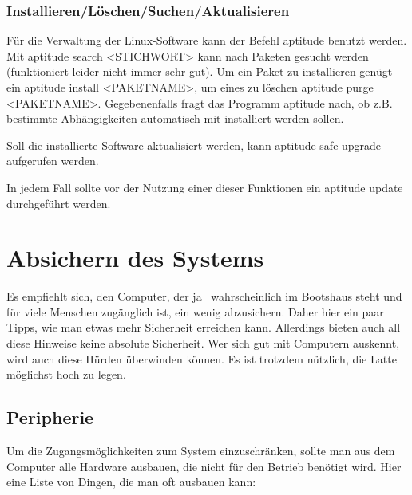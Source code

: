 \documentclass[a4paper,12pt,twoside]{article}
\begin{document}
\bigskip

\subsubsection[Installieren/Löschen/Suchen/Aktualisieren]{Installieren/Löschen/Suchen/Aktualisieren}
\label{bkm:RefHeading11661832955836}Für die Verwaltung der
Linux-Software kann der Befehl {\textquotedbl}aptitude{\textquotedbl}
benutzt werden. Mit {\textquotedbl}aptitude search
{\textless}STICHWORT{\textgreater}{\textquotedbl} kann nach Paketen
gesucht werden (funktioniert leider nicht immer sehr gut). Um ein Paket
zu installieren genügt ein {\textquotedbl}aptitude install
{\textless}PAKETNAME{\textgreater}{\textquotedbl}, um eines zu löschen
{\textquotedbl}aptitude purge
{\textless}PAKETNAME{\textgreater}{\textquotedbl}. Gegebenenfalls fragt
das Programm aptitude nach, ob z.B. bestimmte Abhängigkeiten
automatisch mit installiert werden sollen.

Soll die installierte Software aktualisiert werden, kann
{\textquotedbl}aptitude safe-upgrade{\textquotedbl} aufgerufen werden.

In jedem Fall sollte vor der Nutzung einer dieser Funktionen ein
{\textquotedbl}aptitude update{\textquotedbl} durchgeführt werden.


\bigskip

\section[Absichern des Systems]{Absichern des Systems}
\label{bkm:RefHeading173029115634}Es empfiehlt sich, den Computer, der
ja \ wahrscheinlich im Bootshaus steht und für viele Menschen
zugänglich ist, ein wenig abzusichern. Daher hier ein paar Tipps, wie
man etwas mehr Sicherheit erreichen kann. Allerdings bieten auch all
diese Hinweise keine absolute Sicherheit. Wer sich gut mit Computern
auskennt, wird auch diese Hürden überwinden können. Es ist trotzdem
nützlich, die Latte möglichst hoch zu legen.


\bigskip

\subsection[Peripherie]{Peripherie}
\label{bkm:RefHeading31562628}Um die Zugangsmöglichkeiten zum System
einzuschränken, sollte man aus dem Computer alle Hardware ausbauen, die
nicht für den Betrieb benötigt wird. Hier eine Liste von Dingen, die
man oft ausbauen kann:
\end{document}
